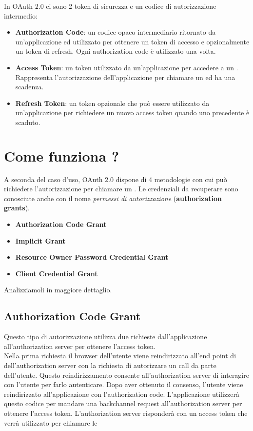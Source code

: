 In OAuth 2.0 ci sono 2 token di sicurezza e un codice di autorizzazione intermedio:

\begin{itemize}
      \item \textbf{Authorization Code}: un codice opaco intermediario ritornato
            da un'applicazione ed utilizzato per ottenere un token di accesso e
            opzionalmente un token di refresh. Ogni authorization code è utilizzato
            una volta.
      \item \textbf{Access Token}: un token utilizzato da un'applicazione per accedere
            a un \api{}. Rappresenta l'autorizzazione dell'applicazione per chiamare un \api{}
            ed ha una scadenza.
      \item \textbf{Refresh Token}: un token opzionale che può essere utilizzato da
            un'applicazione per richiedere un nuovo access token quando uno precedente
            è scaduto.
\end{itemize}

\section{Come funziona ?}

A seconda del caso d'uso, OAuth 2.0 dispone di 4 metodologie con cui può richiedere
l'autorizzazione per chiamare un \api{}. Le credenziali da recuperare sono conosciute
anche con il nome \textit{permessi di autorizzazione} (\textbf{authorization grants}).

\begin{itemize}
      \item \textbf{Authorization Code Grant}
      \item \textbf{Implicit Grant}
      \item \textbf{Resource Owner Password Credential Grant}
      \item \textbf{Client Credential Grant}
\end{itemize}

Analizziamoli in maggiore dettaglio.

\subsection{Authorization Code Grant}

Questo tipo di autorizzazione utilizza due richieste dall'applicazione all'authorization
server per ottenere l'access token.\\
Nella prima richiesta il browser dell'utente viene reindirizzato all'end point di
dell'authorization server con la richiesta di autorizzare un \api{} call da parte
dell'utente.
Questo reindirizzamento consente all'authorization server di interagire con l'utente
per farlo autenticare. Dopo aver ottenuto il consenso, l'utente viene reindirizzato
all'applicazione
con l'authorization code. L'applicazione utilizzerà questo codice per mandare una
backchannel request all'authorization server per ottenere l'access token.
L'authorization server risponderà con un access token che verrà utilizzato per
chiamare le \api{}

